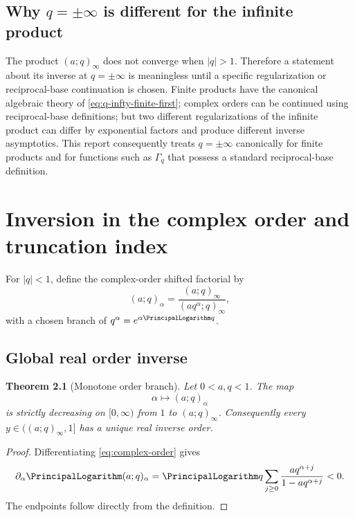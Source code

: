 \documentclass[11pt,oneside]{book}
\newtheorem{theorem}{Theorem}[chapter]
\theoremstyle{definition}
\theoremstyle{remark}
\begin{document}
\section{Why $q=\pm\infty$ is different for the infinite product}
The product $(a;q)_\infty$ does not converge when $|q|>1$.  Therefore a
statement about its inverse at $q=\pm\infty$ is meaningless until a specific
regularization or reciprocal-base continuation is chosen.  Finite products
have the canonical algebraic theory of \cref{eq:q-infty-finite-first}; complex
orders can be continued using reciprocal-base definitions; but two different
regularizations of the infinite product can differ by exponential factors and
produce different inverse asymptotics.  This report consequently treats
$q=\pm\infty$ canonically for finite products and for functions such as
$\Gamma_q$ that possess a standard reciprocal-base definition.

\chapter{Inversion in the complex order and truncation index}

For $|q|<1$, define the complex-order shifted factorial by
\begin{equation}\label{eq:complex-order}
 (a;q)_\alpha=\frac{(a;q)_\infty}{(aq^\alpha;q)_\infty},
\end{equation}
with a chosen branch of $q^\alpha=e^{\alpha\PrincipalLogarithm q}$.

\section{Global real order inverse}
\begin{theorem}[Monotone order branch]\label{thm:alpha-global}
Let $0<a,q<1$.  The map
\[
 \alpha\longmapsto(a;q)_\alpha
\]
is strictly decreasing on $[0,\infty)$ from $1$ to $(a;q)_\infty$.
Consequently every $y\in((a;q)_\infty,1]$ has a unique real inverse order.
\end{theorem}
\begin{proof}
Differentiating \eqref{eq:complex-order} gives
\begin{equation}\label{eq:alpha-logder}
 \partial_\alpha\PrincipalLogarithm(a;q)_\alpha
 =\PrincipalLogarithm q\sum_{j\ge0}\frac{aq^{\alpha+j}}{1-aq^{\alpha+j}}<0.
\end{equation}
The endpoints follow directly from the definition.
\end{proof}
\end{document}
